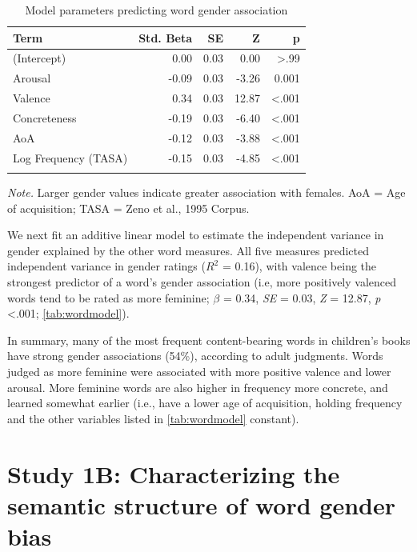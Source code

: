 \documentclass[english,,man,floatsintext]{apa6}
\begin{document}
\begin{table}[tbp]
\begin{center}
\begin{threeparttable}
\caption{\label{tab:wordmodel}Model parameters predicting word gender association}
\begin{tabular}{lrrrr}
\toprule
Term & Std. Beta & SE & Z & p\\
\midrule
(Intercept) & 0.00 & 0.03 & 0.00 & >.99\\
Arousal & -0.09 & 0.03 & -3.26 & 0.001\\
Valence & 0.34 & 0.03 & 12.87 & <.001\\
Concreteness & -0.19 & 0.03 & -6.40 & <.001\\
AoA & -0.12 & 0.03 & -3.88 & <.001\\
Log Frequency (TASA) & -0.15 & 0.03 & -4.85 & <.001\\
\bottomrule
\addlinespace
\end{tabular}
\begin{tablenotes}[para]
\normalsize{\textit{Note.} Larger gender values indicate greater association with females. AoA = Age of acquisition;  TASA = Zeno et al., 1995 Corpus.}
\end{tablenotes}
\end{threeparttable}
\end{center}
\end{table}

We next fit an additive linear model to estimate the independent variance in gender explained by the other word measures. All five measures predicted independent variance in gender ratings (\(R^2\) = 0.16), with valence being the strongest predictor of a word's gender association (i.e, more positively valenced words tend to be rated as more feminine; \(\beta\) = 0.34, \emph{SE} = 0.03, \emph{Z} = 12.87, \emph{p} \textless.001; \autoref{tab:wordmodel}).

In summary, many of the most frequent content-bearing words in children's books have strong gender associations (54\%), according to adult judgments. Words judged as more feminine were associated with more positive valence and lower arousal. More feminine words are also higher in frequency more concrete, and learned somewhat earlier (i.e., have a lower age of acquisition, holding frequency and the other variables listed in \autoref{tab:wordmodel} constant).

\hypertarget{study-1b-characterizing-the-semantic-structure-of-word-gender-bias}{%
\section{Study 1B: Characterizing the semantic structure of word gender bias}\label{study-1b-characterizing-the-semantic-structure-of-word-gender-bias}}
\end{document}
